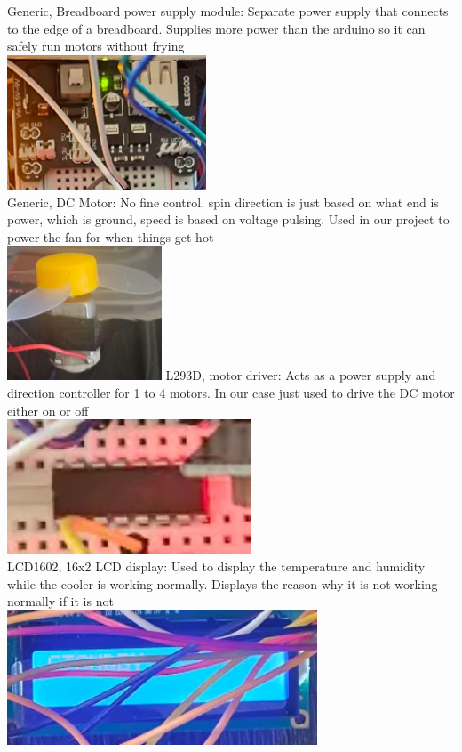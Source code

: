 \documentclass{article}
\begin{document}
Generic, Breadboard power supply module: Separate power supply that connects to the edge of a breadboard. Supplies more power than the arduino so it can safely run motors without frying\\
\includegraphics[height=40mm]{breadboardpower.png}\\
Generic, DC Motor: No fine control, spin direction is just based on what end is power, which is ground, speed is based on voltage pulsing. Used in our project to power the fan for when things get hot\\
\includegraphics[height=40mm]{dcmotor.png}\newpage
L293D, motor driver: Acts as a power supply and direction controller for 1 to 4 motors. In our case just used to drive the DC motor either on or off\\
\includegraphics[height=40mm]{motordriver.png}\\
LCD1602, 16x2 LCD display: Used to display the temperature and humidity while the cooler is working normally. Displays the reason why it is not working normally if it is not\\
\includegraphics[height=40mm]{lcd.png}\\
\end{document}
